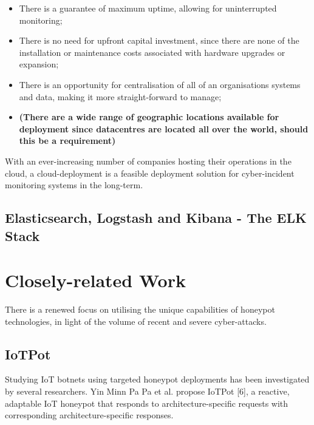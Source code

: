 	\begin{itemize}
		\item There is a guarantee of maximum uptime, allowing for uninterrupted monitoring;
		
		\item There is no need for upfront capital investment, since there are none of the installation or maintenance costs associated with hardware upgrades or expansion;
		
		\item There is an opportunity for centralisation of all of an organisations systems and data, making it more straight-forward to manage;
		
		\item \textbf{(There are a wide range of geographic locations available for deployment since datacentres	are located all over the world, should this be a requirement)}
		
	\end{itemize}
	With an ever-increasing number of companies hosting their operations in the cloud, a cloud-deployment is a feasible deployment solution for cyber-incident monitoring systems in the long-term.


	\subsection{Elasticsearch, Logstash and Kibana - The ELK Stack}


\section{Closely-related Work}


There is a renewed focus on utilising the unique capabilities of honeypot technologies, in light of the volume of recent and severe cyber-attacks. 

	\subsection{IoTPot}
	
	Studying IoT botnets using targeted honeypot deployments has been investigated by several  researchers. Yin Minn Pa Pa et al. propose IoTPot [6], a reactive, adaptable IoT honeypot that responds to architecture-specific  requests with corresponding architecture-specific responses. 
	
